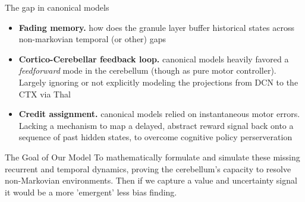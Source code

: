 \documentclass{beamer}
\begin{document}
\begin{frame}{The gap in canonical models}
    \begin{itemize}
    	\item \textbf{Fading memory.} how does the granule layer buffer historical states across non-markovian temporal (or other) gaps
    	\item \textbf{Cortico-Cerebellar feedback loop.} canonical models heavily favored a \textit{feedforward} mode in the cerebellum (though as pure motor controller). Largely ignoring or not explicitly modeling the projections from DCN to the CTX via Thal
    	\item \textbf{Credit assignment.} canonical models relied on instantaneous motor errors. Lacking a mechanism to map a delayed, abstract reward signal back onto a sequence of past hidden states, to overcome cognitive policy perserveration
    \end{itemize}
    
    \vspace{4mm}
    \begin{block}{The Goal of Our Model}
        To mathematically formulate and simulate these missing recurrent and temporal dynamics, proving the cerebellum's capacity to resolve non-Markovian environments. Then if we capture a value and uncertainty signal it would be a more 'emergent' less bias finding.
    \end{block}
\end{frame}
	
\end{document}
